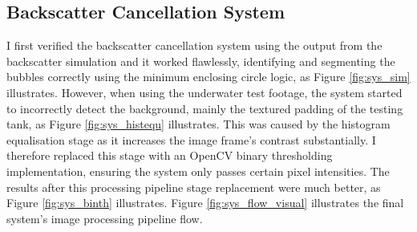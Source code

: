 \subsection{Backscatter Cancellation System}
I first verified the backscatter cancellation system using the output from the backscatter simulation and it worked flawlessly, identifying and segmenting the bubbles correctly using the minimum enclosing circle logic, as Figure \ref{fig:sys_sim} illustrates. However, when using the underwater test footage, the system started to incorrectly detect the background, mainly the textured padding of the testing tank, as Figure \ref{fig:sys_histequ} illustrates. This was caused by the histogram equalisation stage as it increases the image frame's contrast substantially. I therefore replaced this stage with an OpenCV binary thresholding implementation, ensuring the system only passes certain pixel intensities. The results after this processing pipeline stage replacement were much better, as Figure \ref{fig:sys_binth} illustrates. Figure \ref{fig:sys_flow_visual} illustrates the final system's image processing pipeline flow.

